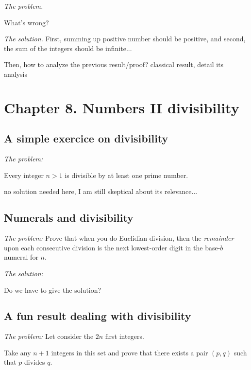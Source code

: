 \medskip

\noindent \textit{The problem.}

What's wrong?

\medskip

\noindent \textit{The solution.}
First, summing up positive number should be positive, 
and second, the sum of the integers should be infinite...

Then, how to analyze the previous result/proof?
{\Denis classical result, detail its analysis}







\section{Chapter 8. Numbers II divisibility}

\subsection{A simple exercice on divisibility}

\noindent \textit{The problem:}

Every integer $n>1$ is divisible by at least one prime number.

{\Denis no solution needed here, I am still skeptical about its relevance...}


\subsection{Numerals and divisibility}

\noindent \textit{The problem:}
Prove that when you do Euclidian division, then the {\em remainder}
upon each consecutive division is the next lowest-order digit in the
base-$b$ numeral for $n$.
\medskip

\noindent \textit{The solution:}

Do we have to give the solution?


\subsection{A fun result dealing with divisibility}

\noindent \textit{The problem:}
Let consider the $2n$ first integers.

Take any $n+1$ integers in this set and prove that there exists a pair $(p,q)$
such that $p$ divides $q$. 
\medskip


